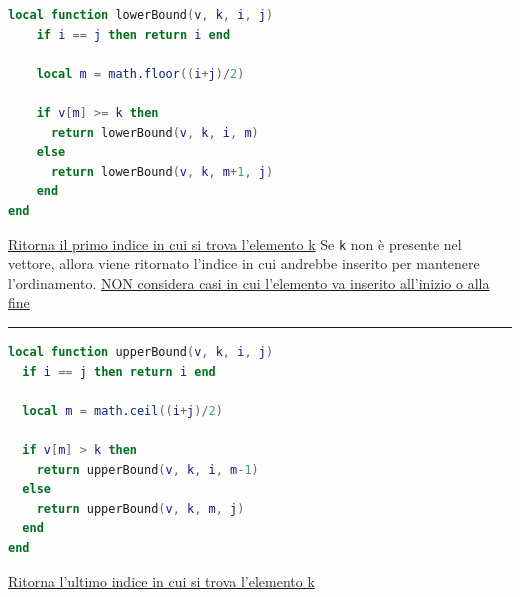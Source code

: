 \begin{minipage}[c]{0.58\textwidth}
\begin{lstlisting}[language = lua, frame = none, numbers = none]
local function lowerBound(v, k, i, j)
    if i == j then return i end

    local m = math.floor((i+j)/2)

    if v[m] >= k then
      return lowerBound(v, k, i, m)
    else
      return lowerBound(v, k, m+1, j)
    end
end
\end{lstlisting}
\end{minipage}
%
\begin{minipage}[c]{0.38\textwidth}
  \underline{Ritorna il primo indice in cui si trova l'elemento k}
  \vskip3mm 
  Se \verb|k| non è presente nel vettore, allora viene ritornato l'indice in cui andrebbe inserito per mantenere l'ordinamento. \underline{NON considera casi in cui l'elemento va inserito all'inizio o alla fine}
\end{minipage}
\vskip3mm
\hrule
\begin{minipage}[c]{0.58\textwidth}
  
\begin{lstlisting}[language = lua, frame = none, numbers = none]
local function upperBound(v, k, i, j)
  if i == j then return i end

  local m = math.ceil((i+j)/2)

  if v[m] > k then
    return upperBound(v, k, i, m-1)
  else
    return upperBound(v, k, m, j)
  end
end
\end{lstlisting}
\end{minipage}
%
\begin{minipage}[c]{0.38\textwidth}
  \underline{Ritorna l'ultimo indice in cui si trova l'elemento k}
\end{minipage}

